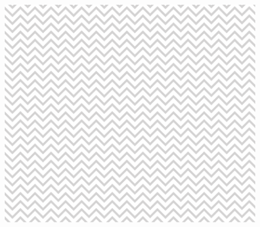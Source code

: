 \documentclass[12pt,a4paper,english]{article}
\begin{document}
\begin{figure}[!h]
\begin{center}
\includegraphics*{met_rapport_monster}          %
\end{center}
\end{figure}



\clearpage

\setlength{\unitlength}{1mm}  %
\end{document}
